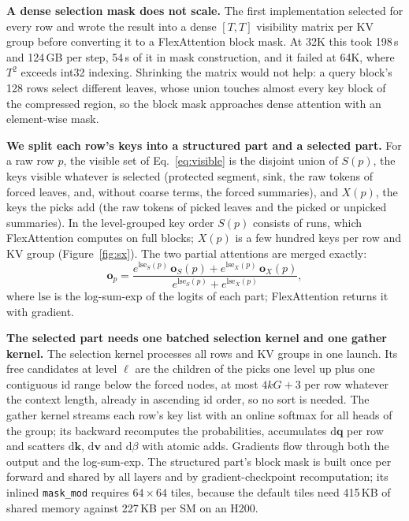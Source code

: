 \documentclass[10pt,twocolumn]{article}
\newcommand{\para}[1]{\noindent\textbf{#1}\hspace{0.5em}}
\begin{document}
\para{A dense selection mask does not scale.}
The first implementation selected for every row and wrote the result into a dense $[T,T]$
visibility matrix per KV group before converting it to a FlexAttention block mask. At 32K this
took 198\,s and 124\,GB per step, 54\,s of it in mask construction, and it failed at 64K, where
$T^2$ exceeds int32 indexing. Shrinking the matrix would not help: a query block's 128 rows
select different leaves, whose union touches almost every key block of the compressed region,
so the block mask approaches dense attention with an element-wise mask.

\para{We split each row's keys into a structured part and a selected part.}
For a raw row $p$, the visible set of Eq.~\eqref{eq:visible} is the disjoint union of $S(p)$,
the keys visible whatever is selected (protected segment, sink, the raw tokens of forced
leaves, and, without coarse terms, the forced summaries), and $X(p)$, the keys the picks add
(the raw tokens of picked leaves and the picked or unpicked summaries). In the level-grouped
key order $S(p)$ consists of runs, which FlexAttention computes on full blocks; $X(p)$ is a few
hundred keys per row and KV group (Figure~\ref{fig:sx}). The two partial attentions are merged
exactly:
\begin{equation}
  \mathbf{o}_p = \frac{e^{\mathrm{lse}_S(p)}\,\mathbf{o}_S(p) + e^{\mathrm{lse}_X(p)}\,\mathbf{o}_X(p)}
                      {e^{\mathrm{lse}_S(p)} + e^{\mathrm{lse}_X(p)}},
  \label{eq:lse}
\end{equation}
where $\mathrm{lse}$ is the log-sum-exp of the logits of each part; FlexAttention returns it
with gradient.

\para{The selected part needs one batched selection kernel and one gather kernel.}
The selection kernel processes all rows and KV groups in one launch. Its free candidates at
level $\ell$ are the children of the picks one level up plus one contiguous id range below the
forced nodes, at most $4kG+3$ per row whatever the context length, already in ascending id
order, so no sort is needed. The gather kernel streams each row's key list with an online
softmax for all heads of the group; its backward recomputes the probabilities, accumulates
$\mathrm{d}\mathbf{q}$ per row and scatters $\mathrm{d}\mathbf{k}$, $\mathrm{d}\mathbf{v}$ and
$\mathrm{d}\beta$ with atomic adds. Gradients flow through both the output and the log-sum-exp.
The structured part's block mask is built once per forward and shared by all layers and by
gradient-checkpoint recomputation; its inlined \texttt{mask\_mod} requires $64\times64$ tiles,
because the default tiles need 415\,KB of shared memory against 227\,KB per SM on an H200.
\end{document}
